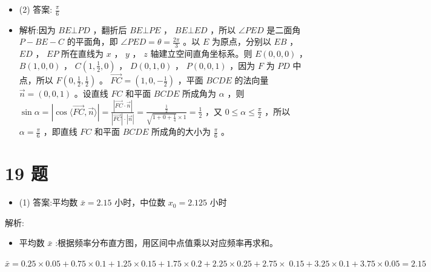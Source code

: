 \documentclass[10pt]{article}
\begin{document}
\begin{itemize}\relax
\item\relax (2) 答案: \(\frac{\pi }{6}\)
\end{itemize}

\begin{itemize}\relax
\item\relax 解析:因为 \({BE} \bot  {PD}\) ，翻折后 \({BE} \bot  {PE}\) ， \({BE} \bot  {ED}\) ，所以 \(\angle {PED}\) 是二面角 \(P - {BE} - C\) 的平面角，即 \(\angle {PED} = \theta  = \frac{2\pi }{3}\) 。以 \(E\) 为原点，分别以 \({EB}\) ， \({ED}\) ， \({EP}\) 所在直线为 \(x\) ， \(y\) ， \(z\) 轴建立空间直角坐标系。则 \(E\left( {0,0,0}\right)\) ， \(B\left( {1,0,0}\right)\) ， \(C\left( {1,\frac{1}{2},0}\right)\) ， \(D\left( {0,1,0}\right)\) ， \(P\left( {0,0,1}\right)\) ，因为 \(F\) 为 \({PD}\) 中点，所以 \(F\left( {0,\frac{1}{2},\frac{1}{2}}\right)\) 。 \(\overrightarrow{FC} = \left( {1,0, - \frac{1}{2}}\right)\) ，平面 \({BCDE}\) 的法向量 \(\overrightarrow{n} = \left( {0,0,1}\right)\) 。设直线 \({FC}\) 和平面 \({BCDE}\) 所成角为 \(\alpha\) ，则 \(\sin \alpha  = \left| {\cos \langle \overrightarrow{FC},\overrightarrow{n}\rangle }\right|  = \frac{\left| \overrightarrow{FC} \cdot  \overrightarrow{n}\right| }{\left| \overrightarrow{FC}\right|  \cdot  \left| \overrightarrow{n}\right| } = \frac{\frac{1}{2}}{\sqrt{1 + 0 + \frac{1}{4}} \times  1} = \frac{1}{2}\) ，又 \(0 \leq  \alpha  \leq  \frac{\pi }{2}\) ，所以 \(\alpha  = \frac{\pi }{6}\) ，即直线 \({FC}\) 和平面 \({BCDE}\) 所成角的大小为 \(\frac{\pi }{6}\) 。
\end{itemize}

\section*{19 题}

\begin{itemize}\relax
\item\relax (1) 答案:平均数 \(\bar{x} = {2.15}\) 小时，中位数 \({x}_{0} = {2.125}\) 小时
\end{itemize}

解析:

\begin{itemize}\relax
\item\relax 平均数 \(\bar{x}\) :根据频率分布直方图，用区间中点值乘以对应频率再求和。
\end{itemize}

\(\bar{x} = {0.25} \times  {0.05} + {0.75} \times  {0.1} + {1.25} \times  {0.15} + {1.75} \times  {0.2} + {2.25} \times  {0.25} + {2.75} \times \; {0.15} + {3.25} \times  {0.1} + {3.75} \times  {0.05} = {2.15}\)
\end{document}
